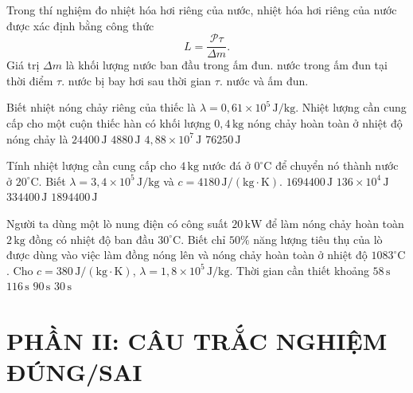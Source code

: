 \begin{ex}
Trong thí nghiệm đo nhiệt hóa hơi riêng của nước, nhiệt hóa hơi riêng của nước được xác định bằng công thức
\[
L=\frac{\mathcal{P}\tau}{\Delta m}.
\]
Giá trị $\Delta m$ là khối lượng
\choice
{nước ban đầu trong ấm đun.}
{nước trong ấm đun tại thời điểm $\tau$.}
{\True nước bị bay hơi sau thời gian $\tau$.}
{nước và ấm đun.}
\end{ex}


\begin{ex}
Biết nhiệt nóng chảy riêng của thiếc là $\lambda=0{,}61\times10^5\,\mathrm{J/kg}$. Nhiệt lượng cần cung cấp cho một cuộn thiếc hàn có khối lượng $0{,}4\,\mathrm{kg}$ nóng chảy hoàn toàn ở nhiệt độ nóng chảy là
\choice
{\True $24400\,\mathrm{J}$}
{$4880\,\mathrm{J}$}
{$4{,}88\times10^7\,\mathrm{J}$}
{$76250\,\mathrm{J}$}
\end{ex}

\begin{ex}
Tính nhiệt lượng cần cung cấp cho $4\,\mathrm{kg}$ nước đá ở $0^\circ\mathrm{C}$ để chuyển nó thành nước ở $20^\circ\mathrm{C}$. Biết $\lambda=3{,}4\times10^5\,\mathrm{J/kg}$ và $c=4180\,\mathrm{J/(kg\cdot K)}$.
\choice
{\True $1694400\,\mathrm{J}$}
{$136\times10^4\,\mathrm{J}$}
{$334400\,\mathrm{J}$}
{$1894400\,\mathrm{J}$}
\end{ex}

\begin{ex}
Người ta dùng một lò nung điện có công suất $20\,\mathrm{kW}$ để làm nóng chảy hoàn toàn $2\,\mathrm{kg}$ đồng có nhiệt độ ban đầu $30^\circ\mathrm{C}$. Biết chỉ $50\%$ năng lượng tiêu thụ của lò được dùng vào việc làm đồng nóng lên và nóng chảy hoàn toàn ở nhiệt độ $1083^\circ\mathrm{C}$. Cho $c=380\,\mathrm{J/(kg\cdot K)}$, $\lambda=1{,}8\times10^5\,\mathrm{J/kg}$. Thời gian cần thiết khoảng
\choice
{$58\,\mathrm{s}$}
{\True $116\,\mathrm{s}$}
{$90\,\mathrm{s}$}
{$30\,\mathrm{s}$}
\end{ex}

\section*{PHẦN II: CÂU TRẮC NGHIỆM ĐÚNG/SAI}


